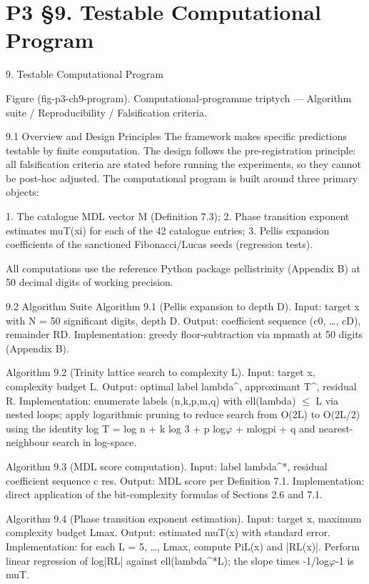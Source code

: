 
\section{P3 §9. Testable Computational Program}

9. Testable Computational Program

                Figure (fig-p3-ch9-program). Computational-programme triptych --- Algorithm suite /
                                       Reproducibility / Falsification criteria.

  9.1 Overview and Design Principles
  The framework makes specific predictions testable by finite computation. The design
  follows the pre-registration principle: all falsification criteria are stated before running
  the experiments, so they cannot be post-hoc adjusted. The computational program is
  built around three primary objects:

  1. The catalogue MDL vector M (Definition 7.3);
  2. Phase transition exponent estimates muT(xi) for each of the 42 catalogue entries;
  3. Pellis expansion coefficients of the sanctioned Fibonacci/Lucas seeds (regression
  tests).

  All computations use the reference Python package pellistrinity (Appendix B) at 50
  decimal digits of working precision.

  9.2 Algorithm Suite
  Algorithm 9.1 (Pellis expansion to depth D).
  Input: target x with N = 50 significant digits, depth D.
  Output: coefficient sequence (c0, …, cD), remainder RD.
  Implementation: greedy floor-subtraction via mpmath at 50 digits (Appendix B).

  Algorithm 9.2 (Trinity lattice search to complexity L).
  Input: target x, complexity budget L.
  Output: optimal label lambda\textasciicircum{}, approximant T\textasciicircum{}, residual R.
  Implementation: enumerate labels (n,k,p,m,q) with ell(lambda) $\leq$ L via nested loops;
  apply logarithmic pruning to reduce search from O(2L) to O(2L/2) using the identity log
  T = log n + k log 3 + p log$\varphi$ + mlogpi + q and nearest-neighbour search in log-space.

  Algorithm 9.3 (MDL score computation).
  Input: label lambda\textasciicircum{}*, residual coefficient sequence c res.
  Output: MDL score per Definition 7.1.
  Implementation: direct application of the bit-complexity formulas of Sections 2.6 and
  7.1.

  Algorithm 9.4 (Phase transition exponent estimation).
  Input: target x, maximum complexity budget Lmax.
  Output: estimated muT(x) with standard error.
  Implementation: for each L = 5, …, Lmax, compute PiL(x) and |RL(x)|. Perform linear
  regression of log|RL| against ell(lambda\textasciicircum{}*L); the slope times -1/log$\varphi$-1 is muT.

